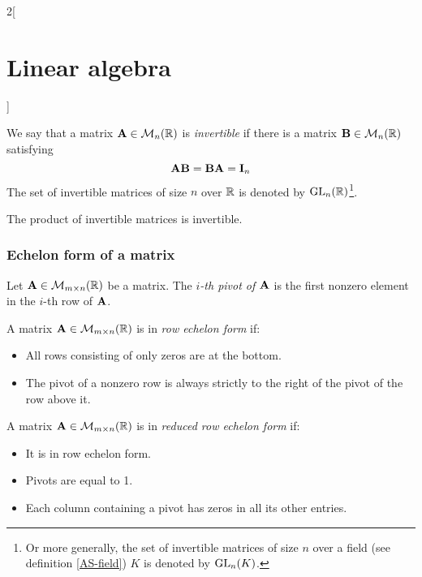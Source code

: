 \documentclass[../../../main.tex]{subfiles}
\begin{document}
\begin{multicols}{2}[\section{Linear algebra}]
  \begin{definition}
    We say that a matrix $\boldsymbol{\mathrm{A}}\in\mathcal{M}_n(\mathbb{R})$ is \textit{invertible} if there is a matrix $\boldsymbol{\mathrm{B}}\in\mathcal{M}_n(\mathbb{R})$ satisfying $$\boldsymbol{\mathrm{A}}\boldsymbol{\mathrm{B}}=\boldsymbol{\mathrm{B}}\boldsymbol{\mathrm{A}}=\boldsymbol{\mathrm{I}}_n$$
    The set of invertible matrices of size $n$ over $\mathbb{R}$ is denoted by $\mathrm{GL}_n(\mathbb{R})$\footnote{Or more generally, the set of invertible matrices of size $n$ over a field (see definition \ref{AS-field}) $K$ is denoted by $\mathrm{GL}_n(K)$.}.
  \end{definition}
  \begin{lemma}
    The product of invertible matrices is invertible.
  \end{lemma}
  \subsubsection{Echelon form of a matrix}
  \begin{definition}
    Let $\boldsymbol{\mathrm{A}}\in\mathcal{M}_{m\times n}(\mathbb{R})$ be a matrix. The \textit{$i$-th pivot of $\boldsymbol{\mathrm{A}}$} is the first nonzero element in the $i$-th row of $\boldsymbol{\mathrm{A}}$.
  \end{definition}
  \begin{definition}
    A matrix $\boldsymbol{\mathrm{A}}\in\mathcal{M}_{m\times n}(\mathbb{R})$ is in \textit{row echelon form} if:
    \begin{itemize}
      \item All rows consisting of only zeros are at the bottom.
      \item The pivot of a nonzero row is always strictly to the right of the pivot of the row above it.
    \end{itemize}
  \end{definition}
  \begin{definition}
    A matrix $\boldsymbol{\mathrm{A}}\in\mathcal{M}_{m\times n}(\mathbb{R})$ is in \textit{reduced row echelon form} if:
    \begin{itemize}
      \item It is in row echelon form.
      \item Pivots are equal to 1.
      \item Each column containing a pivot has zeros in all its other entries.
    \end{itemize}
  \end{definition}
  \begin{theorem}

\end{theorem}
\end{multicols}
\end{document}

